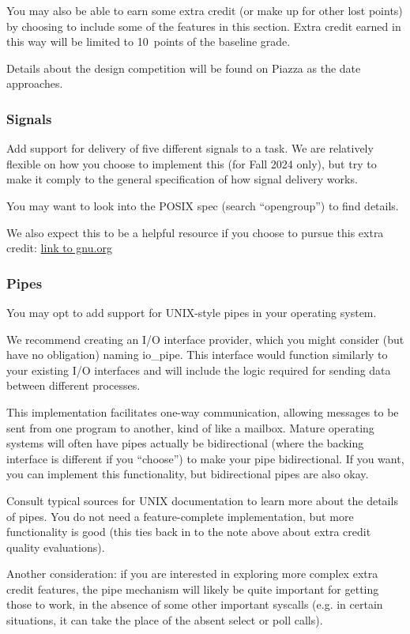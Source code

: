 \documentclass{article}
\begin{document}
You may also be able to earn some extra credit (or make up for
other lost points) by choosing to include some of the features in
this section. Extra credit earned in this way will be limited
to 10~points of the baseline grade.

Details about the design competition will be found on Piazza as the date approaches. 

\subsubsection{Signals}
%
Add support for delivery of five different
signals to a task. We are relatively flexible on how you choose to implement this (for Fall 2024 only),
but try to make it comply to the general specification of how signal delivery works.

You may want to look into the POSIX spec (search ``opengroup'') to find details.

We also expect this to be a helpful resource if you choose to pursue this extra credit:
\href{https://www.gnu.org/software/libc/manual/html_node/Signal-Handling.html}{link to gnu.org}

\subsubsection{Pipes}
You may opt to add support for UNIX-style pipes in your operating system.

We recommend creating an I/O interface provider, which you might consider (but have no obligation) naming {\fix io\_pipe}.
This interface would function similarly to your existing I/O interfaces and will include the logic required for sending data between different processes.

This implementation facilitates one-way communication, allowing messages to be sent from one program to another, kind of like a mailbox.
Mature operating systems will often have pipes actually be bidirectional (where the backing interface is different if you ``choose'') to make your pipe bidirectional.
If you want, you can implement this functionality, but bidirectional pipes are also okay.

Consult typical sources for UNIX documentation to learn more about the details of pipes. You do not need a feature-complete implementation, but more functionality is good (this ties back in to the note above about extra credit quality evaluations).

Another consideration: if you are interested in exploring more complex extra credit features, the pipe mechanism will likely be quite important for getting those to work, in the absence
of some other important syscalls (e.g. in certain situations, it can take the place of the absent {\fix select} or {\fix poll} calls).
\end{document}
